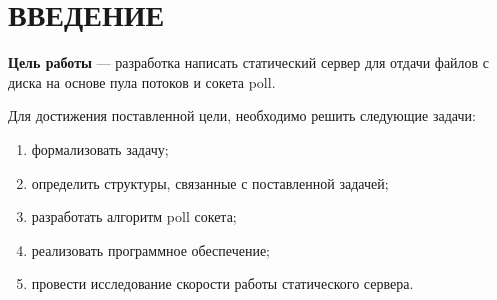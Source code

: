 \section*{\large ВВЕДЕНИЕ}



\textbf{Цель работы} --- разработка написать статический сервер для отдачи файлов с диска на основе пула потоков и сокета poll.


Для достижения поставленной цели, необходимо решить следующие задачи:
\begin{enumerate}
    \item формализовать задачу;
    \item определить структуры, связанные с поставленной задачей;
    \item разработать алгоритм poll сокета;
    \item реализовать программное обеспечение;
    \item провести исследование скорости работы статического сервера.
\end{enumerate}